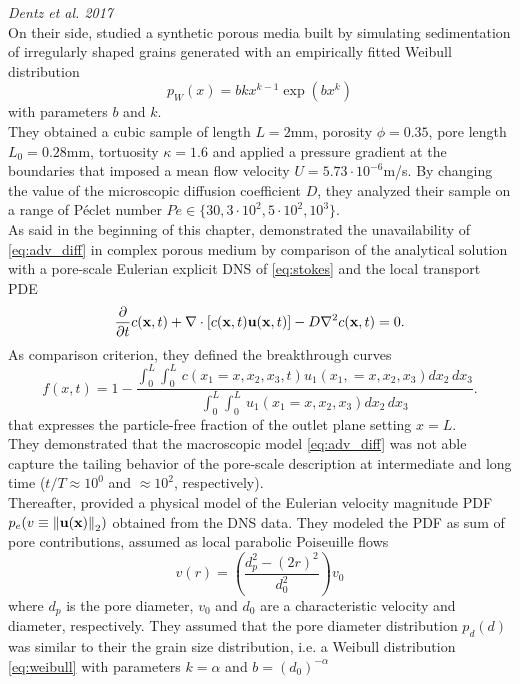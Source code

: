 \textit{Dentz et al. 2017}\\
On their side, \citet{Dentz2017} studied a synthetic porous media built by simulating sedimentation of irregularly shaped grains generated with an empirically fitted Weibull distribution
\begin{equation}\label{eq:weibull}
	p_W(x)=bkx^{k-1}\exp(bx^k)
\end{equation}
with parameters $b$ and $k$.\\
They obtained a cubic sample of length $L=2$mm, porosity $\phi=0.35$, pore length $L_0=0.28$mm, tortuosity $\kappa=1.6$ and applied a pressure gradient at the boundaries that imposed a mean flow velocity $U=5.73\cdot10^{-6}$m/s. By changing the value of the microscopic diffusion coefficient $D$, they analyzed their sample on a range of Péclet number $Pe\in\{30, 3\cdot10^2, 5\cdot10^2, 10^3\}$.\\
As said in the beginning of this chapter, \citeauthor{Dentz2017} demonstrated the unavailability of \eqref{eq:adv_diff} in complex porous medium by comparison of the analytical solution with a pore-scale Eulerian explicit DNS of \eqref{eq:stokes} and the local transport PDE
\begin{equation}\label{eq:micro_adv_diff}
\pdv{t}c(\textbf{x},t)+\nabla\cdot[c(\textbf{x},t)\textbf{u}(\textbf{x},t)]-D \nabla^2c(\textbf{x},t)=0.
\end{equation}
As comparison criterion, they defined the breakthrough curves
\[
f(x,t)=1-\frac{\int_0^L\int_0^L\,c(x_1=x, x_2,x_3,t)u_1(x_1,=x,x_2,x_3)dx_2\,dx_3}{\int_0^L\int_0^L\,u_1(x_1=x,x_2,x_3)dx_2\,dx_3}.
\]
that expresses the particle-free fraction of the outlet plane setting $x=L$.\\
They demonstrated that the macroscopic model \eqref{eq:adv_diff} was not able capture the tailing behavior of the pore-scale description at intermediate and long time ($t/T\approx 10^0$ and $\approx 10^2$, respectively).\\
Thereafter, \citeauthor{Dentz2017} provided a physical model of the Eulerian velocity magnitude PDF $p_e(v\equiv\norm{\textbf{u}(\textbf{x})}_2)$  obtained from the DNS data. 
They modeled the PDF as sum of pore contributions, assumed as local parabolic Poiseuille flows 
\begin{equation}\label{eq:dentz_poiseuille}
v(r)=\left(\frac{d_p^2-(2r)^2}{d_0^2}\right)v_0
\end{equation}
where $d_p$ is the pore diameter, $v_0$ and $d_0$ are a characteristic velocity and diameter, respectively.
They assumed that the pore diameter distribution $p_d(d)$ was similar to their the grain size distribution, i.e. a Weibull distribution \eqref{eq:weibull} with parameters $k=\alpha$ and $b=(d_0)^{-\alpha}$
